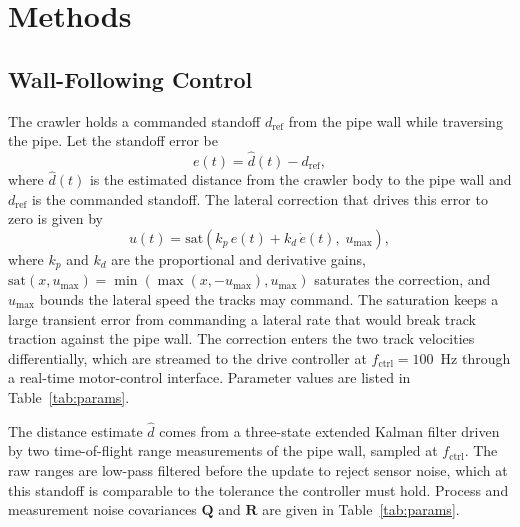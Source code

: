 
\section{Methods}

\subsection{Wall-Following Control}

The crawler holds a commanded standoff $d_{\mathrm{ref}}$ from the pipe wall while
traversing the pipe. Let the standoff error be
%
\begin{equation}
e(t) = \hat{d}(t) - d_{\mathrm{ref}},
\label{eq:error}
\end{equation}
%
where $\hat{d}(t)$ is the estimated distance from the crawler body to the pipe wall and
$d_{\mathrm{ref}}$ is the commanded standoff. The lateral correction that drives this
error to zero is given by
%
\begin{equation}
u(t) = \mathrm{sat}\!\left(k_p\, e(t) + k_d\, \dot{e}(t),\; u_{\max}\right),
\label{eq:pd}
\end{equation}
%
where $k_p$ and $k_d$ are the proportional and derivative gains,
$\mathrm{sat}(x, u_{\max}) = \min(\max(x, -u_{\max}), u_{\max})$ saturates the
correction, and $u_{\max}$ bounds the lateral speed the tracks may command. The
saturation keeps a large transient error from commanding a lateral rate that would
break track traction against the pipe wall. The correction enters the two track
velocities differentially, which are streamed to the drive controller at
$f_{\mathrm{ctrl}} = 100$~Hz through a real-time motor-control interface. Parameter
values are listed in Table~\ref{tab:params}.

The distance estimate $\hat{d}$ comes from a three-state extended Kalman filter driven
by two time-of-flight range measurements of the pipe wall, sampled at
$f_{\mathrm{ctrl}}$. The raw ranges are low-pass filtered before the update to reject
sensor noise, which at this standoff is comparable to the tolerance the controller must
hold. Process and measurement noise covariances $\mathbf{Q}$ and $\mathbf{R}$ are given
in Table~\ref{tab:params}.

